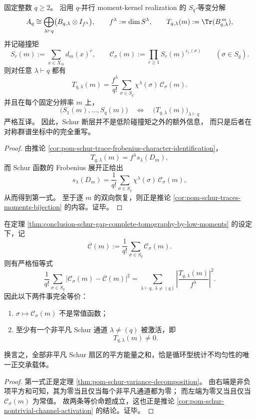\begin{theorem}\label{thm:conclusion-schur-gap-complete-tomography-by-low-moments}
固定整数 \(q\ge 2\)。
沿用 \(q\)-并行 moment-kernel realization 的 \(S_q\)-等变分解
\[
A_q\cong \bigoplus_{\lambda\vdash q}\bigl(B_{q,\lambda}\otimes I_{f^\lambda}\bigr),
\qquad
f^\lambda:=\dim S^\lambda,
\qquad
T_{q,\lambda}(m):=\Tr(B_{q,\lambda}^{\,m}),
\]
并记碰撞矩
\[
S_r(m):=\sum_{x\in X_m}d_m(x)^r,
\qquad
\mathcal C_\sigma(m):=\prod_{r\ge 1}S_r(m)^{c_r(\sigma)}
\qquad (\sigma\in S_q).
\]
则对任意 \(\lambda\vdash q\) 都有
\[
T_{q,\lambda}(m)
=
\frac{f^\lambda}{q!}
\sum_{\sigma\in S_q}\chi^\lambda(\sigma)\,\mathcal C_\sigma(m).
\]
并且在每个固定分辨率 \(m\) 上，
\[
\bigl(S_1(m),\dots,S_q(m)\bigr)
\quad\Longleftrightarrow\quad
\bigl(T_{q,\lambda}(m)\bigr)_{\lambda\vdash q}
\]
严格互译。
因此，Schur 断层并不是低阶碰撞矩之外的额外信息，
而只是后者在对称群谱坐标中的完全重写。
\end{theorem}
\begin{proof}
由推论 \ref{cor:pom-schur-trace-frobenius-character-identification}，
\[
T_{q,\lambda}(m)=f^\lambda s_\lambda(D_m),
\]
而 Schur 函数的 Frobenius 展开正给出
\[
s_\lambda(D_m)
=
\frac{1}{q!}\sum_{\sigma\in S_q}\chi^\lambda(\sigma)\,\mathcal C_\sigma(m),
\]
从而得到第一式。
至于逐 \(m\) 的双向恢复，则正是推论
\ref{cor:pom-schur-traces-moments-bijection} 的内容。证毕。
\end{proof}

\begin{theorem}\label{thm:conclusion-schur-nontrivial-energy-equals-cycle-variance}
在定理 \ref{thm:conclusion-schur-gap-complete-tomography-by-low-moments} 的设定下，记
\[
\overline{\mathcal C}(m):=\frac{1}{q!}\sum_{\sigma\in S_q}\mathcal C_\sigma(m).
\]
则有严格恒等式
\[
\frac{1}{q!}\sum_{\sigma\in S_q}
\bigl|\mathcal C_\sigma(m)-\overline{\mathcal C}(m)\bigr|^2
=
\sum_{\lambda\vdash q,\ \lambda\neq (q)}
\left|\frac{T_{q,\lambda}(m)}{f^\lambda}\right|^2.
\]
因此以下两件事完全等价：
\begin{enumerate}
  \item \(\sigma\mapsto \mathcal C_\sigma(m)\) 不是常值函数；
  \item 至少有一个非平凡 Schur 通道 \(\lambda\neq(q)\) 被激活，即
  \[
  T_{q,\lambda}(m)\neq 0.
  \]
\end{enumerate}
换言之，全部非平凡 Schur 扇区的平方能量之和，恰是循环型统计不均匀性的唯一正交承载体。
\end{theorem}
\begin{proof}
第一式正是定理 \ref{thm:pom-schur-variance-decomposition}。
由右端是非负项平方和可知，其为零当且仅当每个非平凡通道都为零；
而左端为零又当且仅当 \(\mathcal C_\sigma(m)\) 为常值。
故两条等价命题成立，这也正是推论
\ref{cor:pom-schur-nontrivial-channel-activation} 的结论。证毕。
\end{proof}

